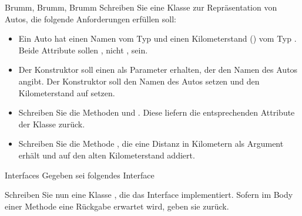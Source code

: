 \documentclass{../tuda-exercise}
\begin{document}
  \begin{task}[credit=\stars{1}{3}]{Brumm, Brumm, Brumm}
    Schreiben Sie eine Klasse  zur Repräsentation von Autos, die folgende Anforderungen
    erfüllen soll:

    \begin{itemize}
      \item Ein Auto hat einen Namen vom Typ  und einen Kilometerstand
      () vom Typ . Beide Attribute sollen
      , nicht , sein.
      \item Der Konstruktor soll einen  als Parameter erhalten, der den Namen
      des Autos angibt. Der Konstruktor soll den Namen des Autos setzen und den Kilometerstand
      auf  setzen.
      \item Schreiben Sie die Methoden  und
      . Diese liefern die entsprechenden Attribute der Klasse
       zurück.
      \item Schreiben Sie die Methode , die eine
      Distanz in Kilometern als Argument erhält und auf den alten Kilometerstand addiert.
    \end{itemize}

    \begin{solution}
      

      \clearpage

      
    \end{solution}
  \end{task}

  \clearpagesolution

  \begin{task}[credit=\stars{1}{3}]{Interfaces}
    Gegeben sei folgendes Interface

    

    Schreiben Sie nun eine Klasse , die das Interface  implementiert. Sofern im
    Body einer Methode eine Rückgabe erwartet wird, geben sie  zurück.

    \begin{solution}
      
    \end{solution}
  \end{task}
\end{document}
